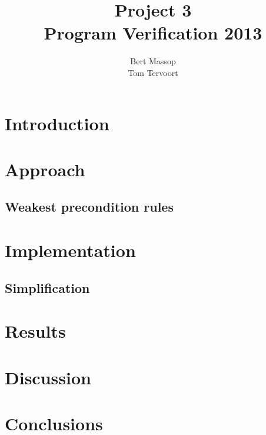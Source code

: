 \documentclass[a4paper]{article}
\title{Project 3\\\large\sc Program Verification 2013}
\author{Bert Massop\\Tom Tervoort}
\begin{document}
\maketitle

\section{Introduction}

\section{Approach}

\subsection{Weakest precondition rules}

\section{Implementation}

\subsection{Simplification}

\section{Results}

\section{Discussion}

\section{Conclusions}
\end{document}
